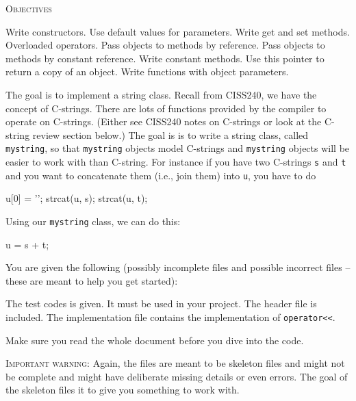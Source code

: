 %
%





\renewcommand\TITLE{Assignment 09}
\usepackage{import}


\topmatter

\textsc{Objectives}
    \begin{tightlist}
    \li    Write constructors.
    \li    Use default values for parameters.
    \li    Write get and set methods.
    \li    Overloaded operators.
    \li    Pass objects to methods by reference.
    \li    Pass objects to methods by constant reference.
    \li    Write constant methods.
    \li    Use this pointer to return a copy of an object.
    \li    Write functions with object parameters.
    \end{tightlist}

The goal is to implement a string class.
Recall from CISS240, we have the concept of C-strings.
There are lots of functions provided by the compiler to operate on C-strings.
(Either see CISS240 notes on C-strings or look at the C-string review section below.)
The goal is is to write a string class, called \verb!mystring!, so that \verb!mystring! objects
model C-strings and \verb!mystring! objects will be easier to work with than C-string.
For instance if you have two C-strings \verb!s! and \verb!t! and you want to concatenate them (i.e., join them) into \verb!u!,
you have to do
\begin{console}
u[0] = '\0';
strcat(u, s);
strcat(u, t);
\end{console}
Using our \verb!mystring! class, we can do this:
\begin{console}
u = s + t;
\end{console}

You are given the following (possibly incomplete files and possible incorrect files -- these are meant to help you get started):
\begin{tightlist}
    \li    The test codes is given. It must be used in your project.
    \li    The header file is included.
    \li    The implementation file contains the implementation of \verb!operator<<!.
\end{tightlist}

Make sure you read the whole document before you dive into the code.

\textsc{Important warning}: Again, the files are meant to be skeleton files and might not be complete and
might have deliberate missing details or even errors.
The goal of the skeleton files it to give you something to work with.

